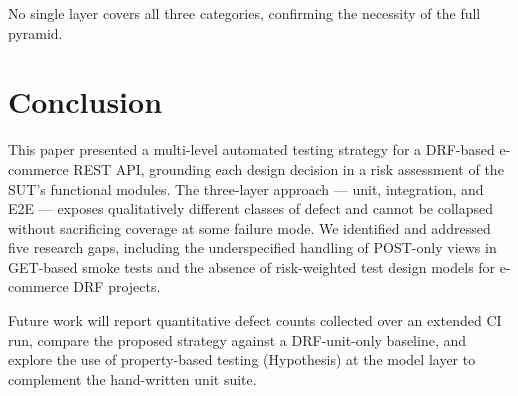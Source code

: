 \documentclass[12pt, a4paper]{article}
\begin{document}
No single layer covers all three categories, confirming the necessity of the
full pyramid.

\section{Conclusion}
\label{sec:conclusion}

This paper presented a multi-level automated testing strategy for a DRF-based
e-commerce REST API, grounding each design decision in a risk assessment of
the SUT's functional modules.  The three-layer approach — unit, integration,
and E2E — exposes qualitatively different classes of defect and cannot be
collapsed without sacrificing coverage at some failure mode.  We identified and
addressed five research gaps, including the underspecified handling of POST-only
views in GET-based smoke tests and the absence of risk-weighted test design
models for e-commerce DRF projects.

Future work will report quantitative defect counts collected over an extended
CI run, compare the proposed strategy against a DRF-unit-only baseline, and
explore the use of property-based testing (Hypothesis) at the model layer to
complement the hand-written unit suite.
\end{document}
